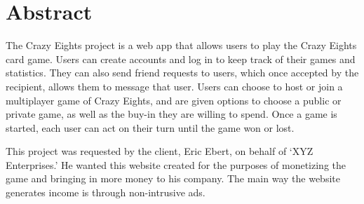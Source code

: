 \section*{Abstract}






The Crazy Eights project is a web app that allows users to play the Crazy Eights card game. Users can create accounts and log in to keep track of their games and statistics. They can also send friend requests to users, which once accepted by the recipient, allows them to message that user. Users can choose to host or join a multiplayer game of Crazy Eights, and are given options to choose a public or private game, as well as the buy-in they are willing to spend. Once a game is started, each user can act on their turn until the game won or lost.

This project was requested by the client, Eric Ebert, on behalf of `XYZ Enterprises.' He wanted this website created for the purposes of monetizing the game and bringing in more money to his company. The main way the website generates income is through non-intrusive ads.

